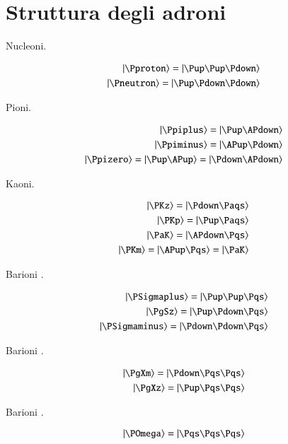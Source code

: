 \documentclass[main.tex]{subfiles}
\begin{document}
\section{Struttura degli adroni}
\begin{enumerate*}

\item Nucleoni.

\begin{align*}
\ket{\Pproton}=\ket{\Pup\Pup\Pdown}\\
\ket{\Pneutron}=\ket{\Pup\Pdown\Pdown}
\end{align*}

\item Pioni.

\begin{align*}
\ket{\Ppiplus}=\ket{\Pup\APdown}\\ \ket{\Ppiminus}=\ket{\APup\Pdown}\\ \ket{\Ppizero}=\ket{\Pup\APup}=\ket{\Pdown\APdown}
\end{align*}

\item Kaoni.

\begin{align*}
\ket{\PKz}=\ket{\Pdown\Paqs}\\
\ket{\PKp}=\ket{\Pup\Paqs}\\
\ket{\PaK}=\ket{\APdown\Pqs}\\ \ket{\PKm}=\ket{\APup\Pqs}=\ket{\PaK}
\end{align*}

\item Barioni \PSigma.

\begin{align*}
\ket{\PSigmaplus}=\ket{\Pup\Pup\Pqs}\\ \ket{\PgSz}=\ket{\Pup\Pdown\Pqs}\\
\ket{\PSigmaminus}=\ket{\Pdown\Pdown\Pqs}
\end{align*}

\item Barioni \PXi.

\begin{align*}
\ket{\PgXm}=\ket{\Pdown\Pqs\Pqs}\\
\ket{\PgXz}=\ket{\Pup\Pqs\Pqs}
\end{align*}

\item Barioni \POmega.

\begin{equation*}
\ket{\POmega}=\ket{\Pqs\Pqs\Pqs}
\end{equation*}

\end{enumerate*}
\end{document}

